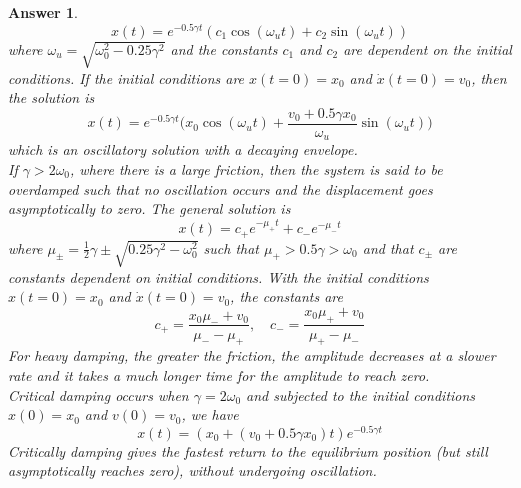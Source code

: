 \documentclass[a4paper]{article}
\newtheorem{ans}{Answer}[subsection]
\theoremstyle{new}
\begin{document}
\begin{ans}
$$x(t)=e^{-0.5\gamma t}(c_1\cos(\omega_ut)+c_2\sin(\omega_ut))$$
where $\omega_u=\sqrt{\omega_0^2-0.25\gamma^2}$ and the constants $c_1$ and $c_2$ are dependent on the initial conditions. If the initial conditions are $x(t=0)=x_0$ and $\dot{x}(t=0)=v_0$, then the solution is
$$x(t)=e^{-0.5\gamma t}\bigg(x_0\cos(\omega_ut)+\frac{v_0+0.5\gamma x_0}{\omega_u}\sin(\omega_ut)\bigg)$$
which is an oscillatory solution with a decaying envelope.\\[5pt]
If $\gamma>2\omega_0$, where there is a large friction, then the system is said to be overdamped such that no oscillation occurs and the displacement goes asymptotically to zero. The general solution is
$$x(t)=c_+e^{-\mu_+t}+c_-e^{-\mu_-t}$$
where $\mu_{\pm}=\frac{1}{2}\gamma\pm\sqrt{0.25\gamma^2-\omega_0^2}$ such that $\mu_+>0.5\gamma>\omega_0$ and that $c_{\pm}$ are constants dependent on initial conditions. With the initial conditions $x(t=0)=x_0$ and $\dot{x}(t=0)=v_0$, the constants are
$$c_+=\frac{x_0\mu_-+v_0}{\mu_--\mu_+},\quad c_-=\frac{x_0\mu_++v_0}{\mu_+-\mu_-}$$
For heavy damping, the greater the friction, the amplitude decreases at a slower rate and it takes a much longer time for the amplitude to reach zero.\\[5pt]
Critical damping occurs when $\gamma=2\omega_0$ and subjected to the initial conditions $x(0)=x_0$ and $v(0)=v_0$, we have
$$x(t)=(x_0+(v_0+0.5\gamma x_0)t)e^{-0.5\gamma t}$$
Critically damping gives the fastest return to the equilibrium position (but still asymptotically reaches zero), without undergoing oscillation.

\end{ans}
\end{document}
